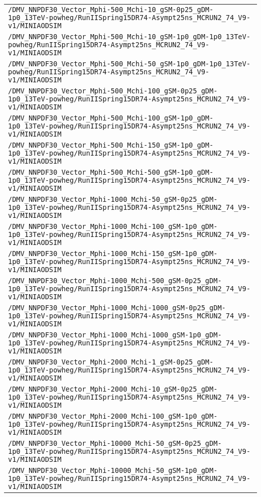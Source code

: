 \begin{center}
\begin{tabular}{l}
\verb!/DMV_NNPDF30_Vector_Mphi-500_Mchi-10_gSM-0p25_gDM-1p0_13TeV-powheg/RunIISpring15DR74-Asympt25ns_MCRUN2_74_V9-v1/MINIAODSIM! \tabularnewline
\verb!/DMV_NNPDF30_Vector_Mphi-500_Mchi-10_gSM-1p0_gDM-1p0_13TeV-powheg/RunIISpring15DR74-Asympt25ns_MCRUN2_74_V9-v1/MINIAODSIM! \tabularnewline
\verb!/DMV_NNPDF30_Vector_Mphi-500_Mchi-50_gSM-1p0_gDM-1p0_13TeV-powheg/RunIISpring15DR74-Asympt25ns_MCRUN2_74_V9-v1/MINIAODSIM! \tabularnewline
\verb!/DMV_NNPDF30_Vector_Mphi-500_Mchi-100_gSM-0p25_gDM-1p0_13TeV-powheg/RunIISpring15DR74-Asympt25ns_MCRUN2_74_V9-v1/MINIAODSIM! \tabularnewline
\verb!/DMV_NNPDF30_Vector_Mphi-500_Mchi-100_gSM-1p0_gDM-1p0_13TeV-powheg/RunIISpring15DR74-Asympt25ns_MCRUN2_74_V9-v1/MINIAODSIM! \tabularnewline
\verb!/DMV_NNPDF30_Vector_Mphi-500_Mchi-150_gSM-1p0_gDM-1p0_13TeV-powheg/RunIISpring15DR74-Asympt25ns_MCRUN2_74_V9-v1/MINIAODSIM! \tabularnewline
\verb!/DMV_NNPDF30_Vector_Mphi-500_Mchi-500_gSM-1p0_gDM-1p0_13TeV-powheg/RunIISpring15DR74-Asympt25ns_MCRUN2_74_V9-v1/MINIAODSIM! \tabularnewline
\verb!/DMV_NNPDF30_Vector_Mphi-1000_Mchi-50_gSM-0p25_gDM-1p0_13TeV-powheg/RunIISpring15DR74-Asympt25ns_MCRUN2_74_V9-v1/MINIAODSIM! \tabularnewline
\verb!/DMV_NNPDF30_Vector_Mphi-1000_Mchi-100_gSM-1p0_gDM-1p0_13TeV-powheg/RunIISpring15DR74-Asympt25ns_MCRUN2_74_V9-v1/MINIAODSIM! \tabularnewline
\verb!/DMV_NNPDF30_Vector_Mphi-1000_Mchi-150_gSM-1p0_gDM-1p0_13TeV-powheg/RunIISpring15DR74-Asympt25ns_MCRUN2_74_V9-v1/MINIAODSIM! \tabularnewline
\verb!/DMV_NNPDF30_Vector_Mphi-1000_Mchi-500_gSM-0p25_gDM-1p0_13TeV-powheg/RunIISpring15DR74-Asympt25ns_MCRUN2_74_V9-v1/MINIAODSIM! \tabularnewline
\verb!/DMV_NNPDF30_Vector_Mphi-1000_Mchi-1000_gSM-0p25_gDM-1p0_13TeV-powheg/RunIISpring15DR74-Asympt25ns_MCRUN2_74_V9-v1/MINIAODSIM! \tabularnewline
\verb!/DMV_NNPDF30_Vector_Mphi-1000_Mchi-1000_gSM-1p0_gDM-1p0_13TeV-powheg/RunIISpring15DR74-Asympt25ns_MCRUN2_74_V9-v1/MINIAODSIM! \tabularnewline
\verb!/DMV_NNPDF30_Vector_Mphi-2000_Mchi-1_gSM-0p25_gDM-1p0_13TeV-powheg/RunIISpring15DR74-Asympt25ns_MCRUN2_74_V9-v1/MINIAODSIM! \tabularnewline
\verb!/DMV_NNPDF30_Vector_Mphi-2000_Mchi-10_gSM-0p25_gDM-1p0_13TeV-powheg/RunIISpring15DR74-Asympt25ns_MCRUN2_74_V9-v1/MINIAODSIM! \tabularnewline
\verb!/DMV_NNPDF30_Vector_Mphi-2000_Mchi-100_gSM-1p0_gDM-1p0_13TeV-powheg/RunIISpring15DR74-Asympt25ns_MCRUN2_74_V9-v1/MINIAODSIM! \tabularnewline
\verb!/DMV_NNPDF30_Vector_Mphi-10000_Mchi-50_gSM-0p25_gDM-1p0_13TeV-powheg/RunIISpring15DR74-Asympt25ns_MCRUN2_74_V9-v1/MINIAODSIM! \tabularnewline
\verb!/DMV_NNPDF30_Vector_Mphi-10000_Mchi-50_gSM-1p0_gDM-1p0_13TeV-powheg/RunIISpring15DR74-Asympt25ns_MCRUN2_74_V9-v1/MINIAODSIM! \tabularnewline

\end{tabular}
\end{center}
